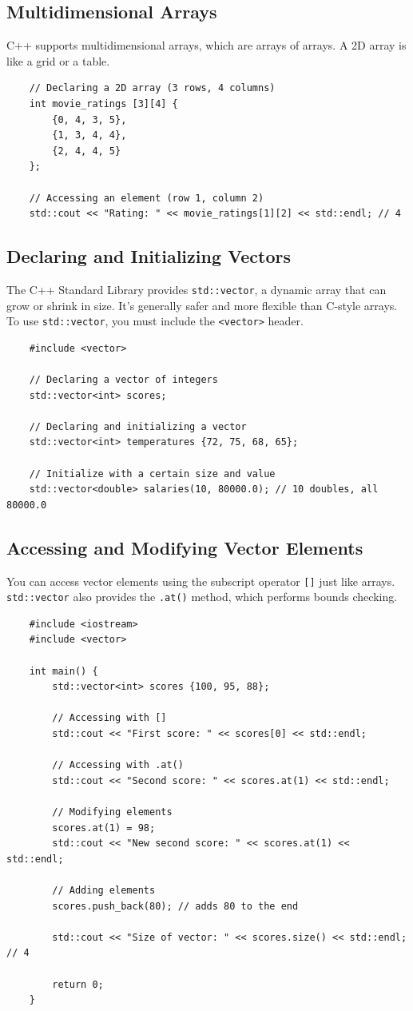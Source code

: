 \subsection{Multidimensional Arrays}
C++ supports multidimensional arrays, which are arrays of arrays. A 2D array is like a grid or a table.

\begin{lstlisting}
	// Declaring a 2D array (3 rows, 4 columns)
	int movie_ratings [3][4] {
		{0, 4, 3, 5},
		{1, 3, 4, 4},
		{2, 4, 4, 5}
	};

	// Accessing an element (row 1, column 2)
	std::cout << "Rating: " << movie_ratings[1][2] << std::endl; // 4
\end{lstlisting}

\subsection{Declaring and Initializing Vectors}
The C++ Standard Library provides \texttt{std::vector}, a dynamic array that can grow or shrink in size. It's generally safer and more flexible than C-style arrays. To use \texttt{std::vector}, you must include the \texttt{<vector>} header.

\begin{lstlisting}
	#include <vector>

	// Declaring a vector of integers
	std::vector<int> scores;

	// Declaring and initializing a vector
	std::vector<int> temperatures {72, 75, 68, 65};

	// Initialize with a certain size and value
	std::vector<double> salaries(10, 80000.0); // 10 doubles, all 80000.0
\end{lstlisting}

\subsection{Accessing and Modifying Vector Elements}
You can access vector elements using the subscript operator \texttt{[]} just like arrays. \texttt{std::vector} also provides the \texttt{.at()} method, which performs bounds checking.

\begin{lstlisting}
	#include <iostream>
	#include <vector>

	int main() {
		std::vector<int> scores {100, 95, 88};

		// Accessing with []
		std::cout << "First score: " << scores[0] << std::endl;

		// Accessing with .at()
		std::cout << "Second score: " << scores.at(1) << std::endl;

		// Modifying elements
		scores.at(1) = 98;
		std::cout << "New second score: " << scores.at(1) << std::endl;

		// Adding elements
		scores.push_back(80); // adds 80 to the end

		std::cout << "Size of vector: " << scores.size() << std::endl; // 4

		return 0;
	}
\end{lstlisting}

